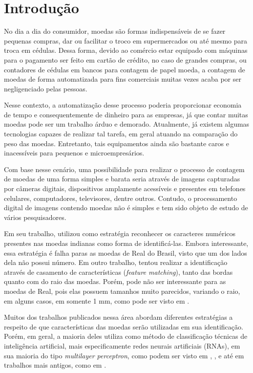 \documentclass[10pt,journal,compsoc]{IEEEtran}
\begin{document}
\section{Introdução}
\label{sec:introducao}

No dia a dia do consumidor, moedas são formas indispensáveis de se fazer pequenas compras, dar ou facilitar o troco em supermercados ou até mesmo para troca em cédulas. Dessa forma, devido ao comércio estar equipado com máquinas para o pagamento ser feito em cartão de crédito, no caso de grandes compras, ou contadores de cédulas em bancos para contagem de papel moeda, a contagem de moedas de forma automatizada para fins comerciais  muitas vezes acaba por ser negligenciado pelas pessoas.

Nesse contexto, a automatização desse processo poderia proporcionar economia de tempo e consequentemente de dinheiro para as empresas, já que contar muitas moedas pode ser um trabalho árduo e demorado. Atualmente, já existem algumas tecnologias capazes de realizar tal tarefa, em geral atuando na comparação do peso das moedas. Entretanto, tais equipamentos ainda são bastante caros e inacessíveis para pequenos e microempresários.

Com base nesse cenário, uma possibilidade para realizar o processo de contagem de moedas de uma forma simples e barata seria através de imagens capturadas por câmeras digitais, dispositivos amplamente acessíveis e presentes em telefones celulares, computadores, televisores, dentre outros. Contudo, o processamento digital de imagens contendo moedas não é simples e tem sido objeto de estudo de vários pesquisadores.

Em seu trabalho, \cite{bremananth2005new} utilizou como estratégia reconhecer os caracteres numéricos presentes nas moedas indianas como forma de identificá-las. Embora interessante, essa estratégia é falha paras as moedas de Real do Brasil, visto que um dos lados dela não possui número. Em outro trabalho, \cite{chetan2013robust} tentou realizar a identificação através de casamento de características (\textit{feature matching}), tanto das bordas quanto com do raio das moedas. Porém, pode não ser interessante para as moedas de Real, pois elas possuem tamanhos muito parecidos, variando o raio, em alguns casos, em somente 1 mm, como pode ser visto em \cite{bcb}.

Muitos dos trabalhos publicados nessa área abordam diferentes estratégias a respeito de que características das moedas serão utilizadas em sua identificação. Porém, em geral, a maioria deles utiliza como método de classificação técnicas de inteligência artificial, mais especificamente redes neurais artificiais (RNAs), em sua maioria do tipo \textit{multilayer perceptron}, como podem ser visto em \cite{bremananth2005new}, \cite{kaur2015coin}, \cite{modi2013automated} e até em trabalhos mais antigos, como em \cite{fukumi1992rotation}.
\end{document}
